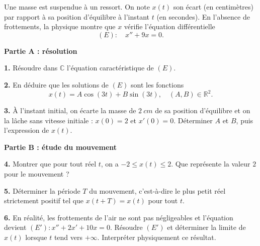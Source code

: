 \documentclass[11pt]{article}
\begin{document}
\begin{exercice}
Une masse est suspendue à un ressort. On note $x(t)$ son écart (en centimètres) par rapport à sa position d'équilibre à l'instant $t$ (en secondes). En l'absence de frottements, la physique montre que $x$ vérifie l'équation différentielle
\[ (E) : \quad x'' + 9x = 0. \]

\textbf{Partie A : résolution}

\textbf{1.} Résoudre dans $\mathbb{C}$ l'équation caractéristique de $(E)$.

\textbf{2.} En déduire que les solutions de $(E)$ sont les fonctions
\[ x(t) = A\cos(3t) + B\sin(3t), \quad (A, B) \in \mathbb{R}^2. \]

\textbf{3.} À l'instant initial, on écarte la masse de $\SI{2}{cm}$ de sa position d'équilibre et on la lâche sans vitesse initiale : $x(0) = 2$ et $x'(0) = 0$. Déterminer $A$ et $B$, puis l'expression de $x(t)$.

\textbf{Partie B : étude du mouvement}

\textbf{4.} Montrer que pour tout réel $t$, on a $-2 \leq x(t) \leq 2$. Que représente la valeur $2$ pour le mouvement ?

\textbf{5.} Déterminer la période $T$ du mouvement, c'est-à-dire le plus petit réel strictement positif tel que $x(t + T) = x(t)$ pour tout $t$.

\textbf{6.} En réalité, les frottements de l'air ne sont pas négligeables et l'équation devient $(E') : x'' + 2x' + 10x = 0$. Résoudre $(E')$ et déterminer la limite de $x(t)$ lorsque $t$ tend vers $+\infty$. Interpréter physiquement ce résultat.
\end{exercice}
\end{document}
